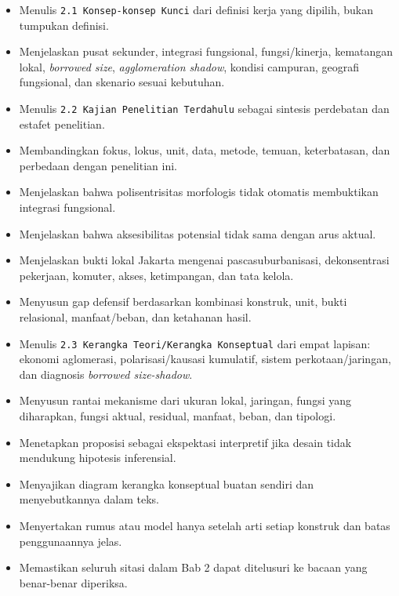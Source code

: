 \documentclass[
  indonesian,
  11pt,
]{article}
\providecommand{\tightlist}{%
  \setlength{\itemsep}{0pt}\setlength{\parskip}{0pt}}
\renewcommand{\tightlist}{%
  \setlength{\itemsep}{0.22em}%
  \setlength{\parskip}{0pt}%
}
\begin{document}
\begin{itemize}
\tightlist
\item[$\square$]
  Menulis \texttt{2.1\ Konsep-konsep\ Kunci} dari definisi kerja yang
  dipilih, bukan tumpukan definisi.
\item[$\square$]
  Menjelaskan pusat sekunder, integrasi fungsional, fungsi/kinerja,
  kematangan lokal, \emph{borrowed size}, \emph{agglomeration shadow},
  kondisi campuran, geografi fungsional, dan skenario sesuai kebutuhan.
\item[$\square$]
  Menulis \texttt{2.2\ Kajian\ Penelitian\ Terdahulu} sebagai sintesis
  perdebatan dan estafet penelitian.
\item[$\square$]
  Membandingkan fokus, lokus, unit, data, metode, temuan, keterbatasan,
  dan perbedaan dengan penelitian ini.
\item[$\square$]
  Menjelaskan bahwa polisentrisitas morfologis tidak otomatis
  membuktikan integrasi fungsional.
\item[$\square$]
  Menjelaskan bahwa aksesibilitas potensial tidak sama dengan arus
  aktual.
\item[$\square$]
  Menjelaskan bukti lokal Jakarta mengenai pascasuburbanisasi,
  dekonsentrasi pekerjaan, komuter, akses, ketimpangan, dan tata kelola.
\item[$\square$]
  Menyusun gap defensif berdasarkan kombinasi konstruk, unit, bukti
  relasional, manfaat/beban, dan ketahanan hasil.
\item[$\square$]
  Menulis \texttt{2.3\ Kerangka\ Teori/Kerangka\ Konseptual} dari empat
  lapisan: ekonomi aglomerasi, polarisasi/kausasi kumulatif, sistem
  perkotaan/jaringan, dan diagnosis \emph{borrowed size-shadow}.
\item[$\square$]
  Menyusun rantai mekanisme dari ukuran lokal, jaringan, fungsi yang
  diharapkan, fungsi aktual, residual, manfaat, beban, dan tipologi.
\item[$\square$]
  Menetapkan proposisi sebagai ekspektasi interpretif jika desain tidak
  mendukung hipotesis inferensial.
\item[$\square$]
  Menyajikan diagram kerangka konseptual buatan sendiri dan
  menyebutkannya dalam teks.
\item[$\square$]
  Menyertakan rumus atau model hanya setelah arti setiap konstruk dan
  batas penggunaannya jelas.
\item[$\square$]
  Memastikan seluruh sitasi dalam Bab 2 dapat ditelusuri ke bacaan yang
  benar-benar diperiksa.
\end{itemize}
\end{document}
